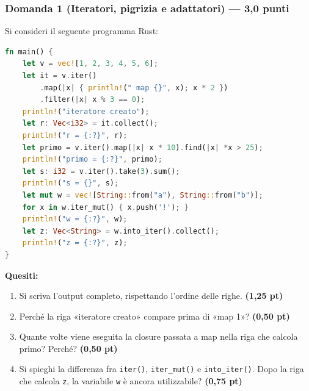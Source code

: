 \documentclass[11pt,a4paper]{article}
\begin{document}
\subsubsection*{Domanda 1 (Iteratori, pigrizia e adattatori) --- 3,0 punti}
Si consideri il seguente programma Rust:
\begin{lstlisting}[language=Rust]
fn main() {
    let v = vec![1, 2, 3, 4, 5, 6];
    let it = v.iter()
        .map(|x| { println!(" map {}", x); x * 2 })
        .filter(|x| x % 3 == 0);
    println!("iteratore creato");
    let r: Vec<i32> = it.collect();
    println!("r = {:?}", r);
    let primo = v.iter().map(|x| x * 10).find(|x| *x > 25);
    println!("primo = {:?}", primo);
    let s: i32 = v.iter().take(3).sum();
    println!("s = {}", s);
    let mut w = vec![String::from("a"), String::from("b")];
    for x in w.iter_mut() { x.push('!'); }
    println!("w = {:?}", w);
    let z: Vec<String> = w.into_iter().collect();
    println!("z = {:?}", z);
}
\end{lstlisting}
\textbf{Quesiti:}
\begin{enumerate}[label=\textbf{\Alph*.}]
    \item Si scriva l'output completo, rispettando l'ordine delle righe. \hfill \textbf{(1,25 pt)}
    \item Perché la riga «iteratore creato» compare prima di «map 1»? \hfill \textbf{(0,50 pt)}
    \item Quante volte viene eseguita la closure passata a map nella riga che calcola primo? Perché? \hfill \textbf{(0,50 pt)}
    \item Si spieghi la differenza fra \texttt{iter()}, \texttt{iter\_mut()} e \texttt{into\_iter()}. Dopo la riga che calcola \texttt{z}, la variabile \texttt{w} è ancora utilizzabile? \hfill \textbf{(0,75 pt)}
\end{enumerate}

\vspace{1em}
\end{document}

